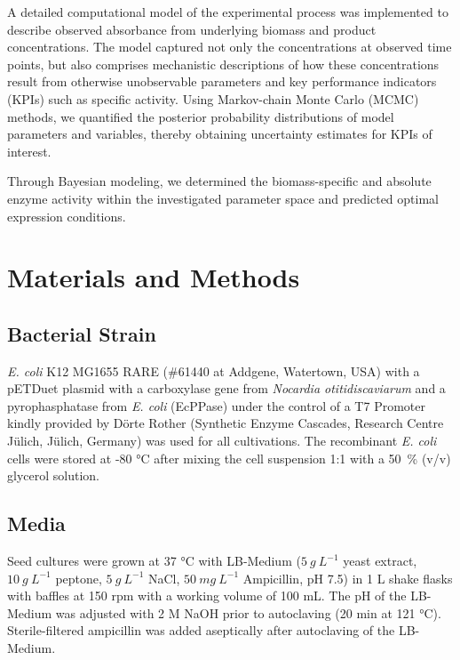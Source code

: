 \documentclass[sn-standardnature]{sn-jnl}%
\theoremstyle{thmstyleone}%
\theoremstyle{thmstyletwo}%
\theoremstyle{thmstylethree}%
\begin{document}
A detailed computational model of the experimental process was implemented to describe observed absorbance from underlying biomass and product concentrations.
The model captured not only the concentrations at observed time points, but also comprises mechanistic descriptions of how these concentrations result from otherwise unobservable parameters and key performance indicators (KPIs) such as specific activity.
Using Markov-chain Monte Carlo (MCMC) methods, we quantified the posterior probability distributions of model parameters and variables, thereby obtaining uncertainty estimates for KPIs of interest.

Through Bayesian modeling, we determined the biomass-specific and absolute enzyme activity within the investigated parameter space and predicted optimal expression conditions.

\section*{Materials and Methods}
\label{sec_mmm}

\subsection{Bacterial Strain}

\textit{E. coli} K12 MG1655 RARE (\#61440 at Addgene, Watertown, USA) with a pETDuet plasmid with a carboxylase gene from \textit{Nocardia otitidiscaviarum} and a pyrophasphatase from \textit{E. coli} (EcPPase) under the control of a T7 Promoter \cite{weber2021production} kindly provided by Dörte Rother (Synthetic Enzyme Cascades, Research Centre Jülich, Jülich, Germany) was used for all cultivations.
The recombinant \textit{E. coli} cells were stored at -80 °C after mixing the cell suspension 1:1 with a 50~\% (v/v) glycerol solution.

\subsection{Media}

Seed cultures were grown at 37 °C with LB-Medium ($5\ g\ L^{-1}$ yeast extract, $10\ g\ L^{-1}$ peptone, $5\ g\ L^{-1}$ NaCl, $50\ mg\ L^{-1}$ Ampicillin, pH 7.5) in 1 L shake flasks with baffles at 150 rpm with a working volume of 100 mL.
The pH of the LB-Medium was adjusted with 2 M NaOH prior to autoclaving (20 min at 121 °C).
Sterile-filtered ampicillin  was added aseptically after autoclaving of the LB-Medium.
\end{document}

